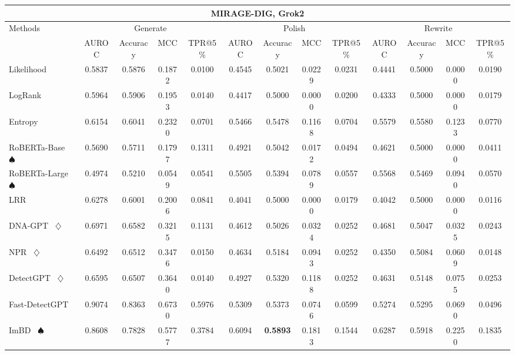 \begin{table*}[h]
{\begin{tabular}{l|cccc|cccc|cccc}
    \hline

    \hline
    \multicolumn{13}{c}{\textbf{MIRAGE-DIG, Grok2}}\\
    \hline

    \hline

    \hline
    \multirow{2}{*}{Methods}&\multicolumn{4}{c|}{Generate}&\multicolumn{4}{c|}{Polish}&\multicolumn{4}{c}{Rewrite} \\
    &  AUROC  &  Accuracy  &  MCC  &  TPR@5\%  &  AUROC  &  Accuracy  &  MCC  &  TPR@5\%  &  AUROC  &  Accuracy  &  MCC  &  TPR@5\%  \\
    \hline

    \hline
    Likelihood~\cite{likelihood} & 0.5837 & 0.5876 & 0.1872 & 0.0100 & 0.4545 & 0.5021 & 0.0229 & 0.0231 & 0.4441 & 0.5000 & 0.0000 & 0.0190 \\
    LogRank~\cite{logrank} & 0.5964 & 0.5906 & 0.1953 & 0.0140 & 0.4417 & 0.5000 & 0.0000 & 0.0200 & 0.4333 & 0.5000 & 0.0000 & 0.0179 \\
    Entropy~\cite{entropy} & 0.6154 & 0.6041 & 0.2320 & 0.0701 & 0.5466 & 0.5478 & 0.1168 & 0.0704 & 0.5579 & 0.5580 & 0.1233 & 0.0770 \\
    RoBERTa-Base~\cite{roberta} $\spadesuit$ & 0.5690 & 0.5711 & 0.1797 & 0.1311 & 0.4921 & 0.5042 & 0.0172 & 0.0494 & 0.4621 & 0.5000 & 0.0000 & 0.0411 \\
    RoBERTa-Large~\cite{roberta} $\spadesuit$ & 0.4974 & 0.5210 & 0.0549 & 0.0541 & 0.5505 & 0.5394 & 0.0789 & 0.0557 & 0.5568 & 0.5469 & 0.0940 & 0.0570 \\
    LRR~\cite{lrrandnpr} & 0.6278 & 0.6001 & 0.2006 & 0.0841 & 0.4041 & 0.5000 & 0.0000 & 0.0179 & 0.4042 & 0.5000 & 0.0000 & 0.0116 \\
    DNA-GPT~\cite{dna-gpt} $\diamondsuit$ & 0.6971 & 0.6582 & 0.3215 & 0.1131 & 0.4612 & 0.5026 & 0.0324 & 0.0252 & 0.4681 & 0.5047 & 0.0325 & 0.0243 \\
    NPR~\cite{lrrandnpr} $\diamondsuit$ & 0.6492 & 0.6512 & 0.3476 & 0.0150 & 0.4634 & 0.5184 & 0.0943 & 0.0252 & 0.4350 & 0.5084 & 0.0609 & 0.0148 \\
    DetectGPT~\cite{detectgpt} $\diamondsuit$ & 0.6595 & 0.6507 & 0.3640 & 0.0140 & 0.4927 & 0.5320 & 0.1188 & 0.0252 & 0.4631 & 0.5148 & 0.0755 & 0.0253 \\
    Fast-DetectGPT~\cite{fastdetectgpt} & 0.9074 & 0.8363 & 0.6730 & 0.5976 & 0.5309 & 0.5373 & 0.0746 & 0.0599 & 0.5274 & 0.5295 & 0.0690 & 0.0496 \\
    ImBD~\cite{imbd} $\spadesuit$ & 0.8608 & 0.7828 & 0.5777 & 0.3784 & 0.6094 & \textbf{0.5893} & 0.1813 & 0.1544 & 0.6287 & 0.5918 & 0.2250 & 0.1835 \\
    \hline
    

\end{tabular}}
\end{table*}
